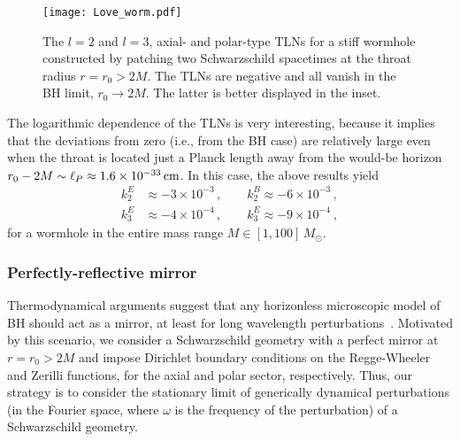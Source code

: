 \documentclass[aps,twocolumn,showpacs,preprintnumbers,nofootinbib,prd,superscriptaddress,groupedaddress,10pt]{revtex4-1}
\begin{document}
\begin{figure}[th]
\centering
\texttt{[image: Love\_worm.pdf]}
\caption{The $l=2$ and $l=3$, axial- and polar-type TLNs for a stiff wormhole constructed by patching two Schwarzschild spacetimes at the throat radius $r=r_0>2M$. The TLNs are negative and all vanish in the BH limit, $r_0\to 2M$. The latter is better displayed in the inset.}
\label{Lovewormhole}
\end{figure}
%
%
The logarithmic dependence of the TLNs is very interesting, because it implies that the deviations from zero (i.e., from the BH case) are relatively large even when the throat is located just a Planck length away from the would-be horizon $r_0-2M\sim \ell_P\approx 1.6\times 10^{-33}\,{\rm cm}$. In this case, the above results yield 
\begin{equation}
\begin{split}
 k_2^{E}&\approx -3\times 10^{-3}\,,\qquad  k_2^{B}\approx -6\times 10^{-3}\,, \\
 k_3^{E}&\approx -4\times 10^{-4}\,, \qquad k_3^{E}\approx -9\times 10^{-4}\ ,
 \end{split}
\end{equation}
%
for a wormhole in the entire mass range $M\in [1,100]\, M_\odot$. 

\subsubsection{Perfectly-reflective mirror} \label{sec:Z2}
Thermodynamical arguments suggest that any horizonless microscopic model of BH should act as a mirror, at least for
long wavelength perturbations~\cite{Saravani:2012is,Abedi:2016hgu}.
%
Motivated by this scenario, we consider a Schwarzschild geometry with a perfect mirror at $r=r_0>2M$ and impose Dirichlet boundary conditions on the Regge-Wheeler and Zerilli functions, for the axial and polar sector, respectively. Thus, our strategy is to consider the stationary limit of generically dynamical perturbations (in the Fourier space, where $\omega$ is the frequency of the perturbation) of a Schwarzschild geometry.
\end{document}
